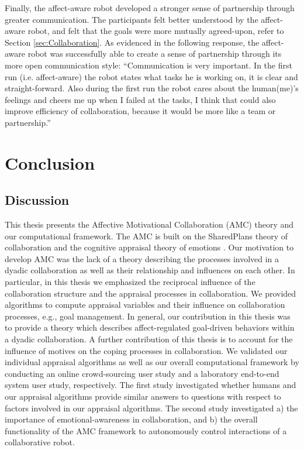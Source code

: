 \documentclass[12pt]{report}
\begin{document}
Finally, the affect-aware robot developed a stronger sense of  partnership
through greater communication. The participants felt better understood by the
affect-aware robot, and felt that the goals were more mutually agreed-upon,
refer to Section \ref{sec:Collaboration}. As evidenced in the following
response, the affect-aware robot was successfully able to create a sense of
partnership through its more open communication style: ``Communication is very
important. In the first run (i.e. affect-aware) the robot states what tasks he
is working on, it is clear and straight-forward. Also during the first run the
robot cares about the human(me)'s feelings and cheers me up when I failed at the
tasks, I think that could also improve efficiency of collaboration, because it
would be more like a team or partnership.''

\chapter{Conclusion}
\label{ch:conclusion}

\section{Discussion}
This thesis presents the Affective Motivational Collaboration (AMC) theory and
our computational framework. The AMC is built on the SharedPlans theory of
collaboration \cite{grosz:plans-discourse} and the cognitive appraisal theory of
emotions \cite{marsella:ema-process-model}
\cite{scherer:appraisal-processes}. Our motivation to develop AMC was the lack
of a theory describing the processes involved in a dyadic collaboration as well
as their relationship and influences on each other. In particular, in this
thesis we emphasized the reciprocal influence of the collaboration structure and
the appraisal processes in collaboration. We provided algorithms to compute
appraisal variables and their influence on collaboration processes, e.g., goal
management. In general, our contribution in this thesis was to provide a theory
which describes affect-regulated goal-driven behaviors within a dyadic
collaboration. A further contribution of this thesis is to account for the
influence of motives on the coping processes in collaboration. We validated our
individual appraisal algorithms as well as our overall computational framework
by conducting an online crowd-sourcing user study and a laboratory end-to-end
system user study, respectively. The first study investigated whether humans and
our appraisal algorithms provide similar answers to questions with respect to
factors involved in our appraisal algorithms. The second study investigated a)
the importance of emotional-awareness in collaboration, and b) the overall
functionality of the AMC framework to autonomously control interactions of a
collaborative robot.
\end{document}
